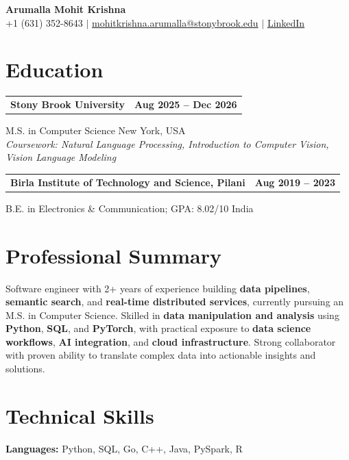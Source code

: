 \documentclass[letterpaper,10pt]{article}
\makeatletter
\newcommand{\entry}[2]{%
  \noindent
  \begin{tabularx}{\linewidth}
    {@{}>{\raggedright\arraybackslash}X@{\hspace{6pt}}r@{}}
    \textbf{#1} & #2
  \end{tabularx}\par
}
\makeatother
\begin{document}
\begin{center}
    {\LARGE\bfseries Arumalla Mohit Krishna}\\[3pt]
    +1 (631) 352-8643 $|$
    \href{mailto:mohitkrishna.arumalla@stonybrook.edu}
    {mohitkrishna.arumalla@stonybrook.edu} $|$
    \href{https://linkedin.com/in/mohit-krishna-arumalla}
    {LinkedIn}
\end{center}
\vspace{-8pt}

\section{Education}

\entry
  {\textbf{Stony Brook University}}
  {\textbf{Aug 2025 -- Dec 2026}}

M.S. in Computer Science \hfill New York, USA\\
\textit{
Coursework: Natural Language Processing,
Introduction to Computer Vision, Vision Language Modeling
}
\vspace{3pt}

\entry
  {\textbf{Birla Institute of Technology and Science, Pilani}}
  {\textbf{Aug 2019 -- 2023}}

B.E. in Electronics \& Communication; GPA: 8.02/10 \hfill India
\section{Professional Summary}

Software engineer with 2+ years of experience building \textbf{data pipelines}, \textbf{semantic search}, and \textbf{real-time distributed services}, currently pursuing an M.S. in Computer Science. Skilled in \textbf{data manipulation and analysis} using \textbf{Python}, \textbf{SQL}, and \textbf{PyTorch}, with practical exposure to \textbf{data science workflows}, \textbf{AI integration}, and \textbf{cloud infrastructure}. Strong collaborator with proven ability to translate complex data into actionable insights and solutions.

\section{Technical Skills}

\textbf{Languages:}
Python, SQL, Go, C++, Java, PySpark, R\\
\end{document}
